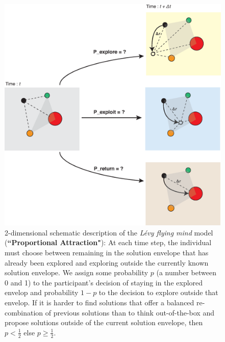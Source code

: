 \begin{figure}[h!]
\begin{center}
\includegraphics[width=15cm]{figures/schematic_displacement.eps}
\caption{2-dimensional schematic description of the {\it L\'evy flying mind} model ({\bf ``Proportional Attraction"}): At each time step, the individual must choose between remaining in the solution envelope that has already been explored and exploring outside the currently known solution envelope.  We assign some probability $p$ (a number between 0 and 1) to the participant's decision of staying in the explored envelop and probability $1-p$ to the decision to explore outside that envelop.  If it is harder to find solutions that offer a balanced re-combination of previous solutions than to think out-of-the-box and propose solutions outside of the current solution envelope, then $p < \frac{1}{2}$ else $p \geq \frac{1}{2}$.}
\label{fig:schematic}
\end{center}
\end{figure}

